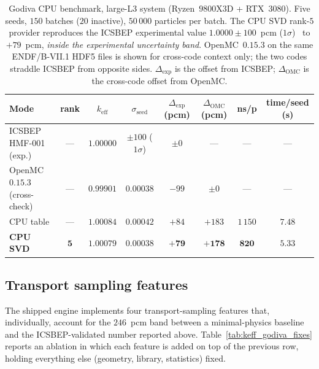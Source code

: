 \begin{table}[t]
\centering
\caption{Godiva CPU benchmark, large-L3 system
(Ryzen~$9800$X3D + RTX~$3080$). Five seeds, $150$ batches
($20$ inactive), $50\,000$ particles per batch. The CPU
SVD rank-$5$ provider reproduces the ICSBEP experimental
value $1.0000 \pm 100$~pcm ($1\sigma$)~\cite{icsbep_hmf001}
to $+79$~pcm, \emph{inside the experimental uncertainty
band}. OpenMC~$0.15.3$ on the same ENDF/B-VII.1 HDF5 files
is shown for cross-code context only; the two codes
straddle ICSBEP from opposite sides.
$\Delta_\text{exp}$ is the offset from ICSBEP;
$\Delta_\text{OMC}$ is the cross-code offset from OpenMC.}
\label{tab:keff_godiva_desktop}
\begin{tabular}{@{}lccccccc@{}}
\toprule
Mode & rank & $k_\text{eff}$ & $\sigma_\text{seed}$ &
$\Delta_\text{exp}$ (pcm) & $\Delta_\text{OMC}$ (pcm)
 & ns/p & time/seed (s) \\
\midrule
ICSBEP HMF-001 (exp.) & ---  & $1.00000$ &
 $\pm 100$ ($1\sigma$) & $\pm 0$ & --- & --- & --- \\
OpenMC $0.15.3$ (cross-check) & ---  & $0.99901$ &
 $0.00038$ & $-99$ & $\pm 0$ & --- & --- \\
\midrule
CPU table           & ---  & $1.00084$ & $0.00042$ &
 $+84$ & $+183$ & $1\,150$ & $7.48$ \\
\textbf{CPU SVD}    & $\mathbf{5}$ & $\mathbf{1.00079}$ &
 $\mathbf{0.00038}$ & $\mathbf{+79}$ & $\mathbf{+178}$ &
 $\mathbf{820}$ & $\mathbf{5.33}$ \\
\bottomrule
\end{tabular}
\end{table}

\subsection{Transport sampling features}
\label{sec:godiva_fixes}

The shipped engine implements four transport-sampling
features that, individually, account for the $246$~pcm
band between a minimal-physics baseline and the
ICSBEP-validated number reported above.
Table~\ref{tab:keff_godiva_fixes} reports an ablation in
which each feature is added on top of the previous row,
holding everything else (geometry, library, statistics)
fixed.

